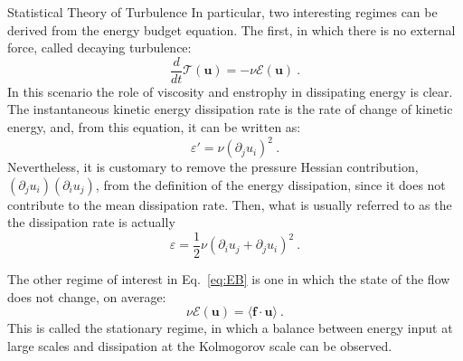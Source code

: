 \begin{chapter}{Statistical Theory of Turbulence}
In particular, two interesting regimes can be derived from the energy
budget equation. The first, in which there is no external force, called
decaying turbulence:
\begin{equation} \label{eq:EB-decay}
	\frac{d}{dt} \mathcal{T}(\mathbf{u}) = - \nu \mathcal{E}(\mathbf{u}) \ .
\end{equation}
In this scenario the role of viscosity and enstrophy in dissipating
energy is clear. The instantaneous kinetic energy dissipation rate is
the rate of change of kinetic energy, and, from this equation, it
can be written as:
\begin{equation}
	\varepsilon' = \nu (\partial_j u_i)^2 \ .
\end{equation}
Nevertheless, it is customary to remove the pressure Hessian contribution,
$(\partial_j u_i) (\partial_i u_j)$,
from the definition of the energy dissipation, since it does not
contribute to the mean dissipation rate. Then, what is usually referred to as the
the dissipation rate is actually
\begin{equation} \label{eq:dissip}
	\varepsilon = \frac12 \nu (\partial_i u_j + \partial_j u_i)^2 \ .
\end{equation}

The other regime of interest in Eq.~\eqref{eq:EB} is one
in which the state of the flow does not change, on average:
\begin{equation} \label{eq:EB-stat}
	\nu \mathcal{E}(\boldsymbol{u}) = \big\langle \mathbf{f \cdot u} \big\rangle \ .
\end{equation}
This is called the stationary regime, in which a balance between
energy input at large scales and dissipation at the Kolmogorov scale can
be observed.


\end{chapter}
